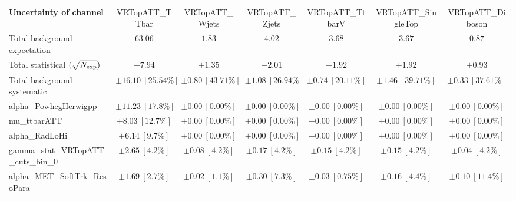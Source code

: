 
\begin{sidewaystable}
\begin{center}
\setlength{\tabcolsep}{0.0pc}
\begin{tabular*}{\textwidth}{@{\extracolsep{\fill}}lcccccc}
\noalign{\smallskip}\hline\noalign{\smallskip}
{\bf Uncertainty of channel}                                    & VRTopATT\_TTbar            & VRTopATT\_Wjets            & VRTopATT\_Zjets            & VRTopATT\_TtbarV            & VRTopATT\_SingleTop            & VRTopATT\_Diboson            \\
\noalign{\smallskip}\hline\noalign{\smallskip}
Total background expectation             &  $63.06$        &  $1.83$        &  $4.02$        &  $3.68$        &  $3.67$        &  $0.87$       \\
\noalign{\smallskip}\hline\noalign{\smallskip}
Total statistical $(\sqrt{N_{\rm exp}})$              & $\pm 7.94$        & $\pm 1.35$        & $\pm 2.01$        & $\pm 1.92$        & $\pm 1.92$        & $\pm 0.93$       \\
Total background systematic               & $\pm 16.10\ [25.54\%] $        & $\pm 0.80\ [43.71\%] $        & $\pm 1.08\ [26.94\%] $        & $\pm 0.74\ [20.11\%] $        & $\pm 1.46\ [39.71\%] $        & $\pm 0.33\ [37.61\%] $             \\
\noalign{\smallskip}\hline\noalign{\smallskip}
\noalign{\smallskip}\hline\noalign{\smallskip}
alpha\_PowhegHerwigpp         & $\pm 11.23\ [17.8\%] $          & $\pm 0.00\ [0.00\%] $          & $\pm 0.00\ [0.00\%] $          & $\pm 0.00\ [0.00\%] $          & $\pm 0.00\ [0.00\%] $          & $\pm 0.00\ [0.00\%] $       \\
mu\_ttbarATT         & $\pm 8.03\ [12.7\%] $          & $\pm 0.00\ [0.00\%] $          & $\pm 0.00\ [0.00\%] $          & $\pm 0.00\ [0.00\%] $          & $\pm 0.00\ [0.00\%] $          & $\pm 0.00\ [0.00\%] $       \\
alpha\_RadLoHi         & $\pm 6.14\ [9.7\%] $          & $\pm 0.00\ [0.00\%] $          & $\pm 0.00\ [0.00\%] $          & $\pm 0.00\ [0.00\%] $          & $\pm 0.00\ [0.00\%] $          & $\pm 0.00\ [0.00\%] $       \\
gamma\_stat\_VRTopATT\_cuts\_bin\_0         & $\pm 2.65\ [4.2\%] $          & $\pm 0.08\ [4.2\%] $          & $\pm 0.17\ [4.2\%] $          & $\pm 0.15\ [4.2\%] $          & $\pm 0.15\ [4.2\%] $          & $\pm 0.04\ [4.2\%] $       \\
alpha\_MET\_SoftTrk\_ResoPara         & $\pm 1.69\ [2.7\%] $          & $\pm 0.02\ [1.1\%] $          & $\pm 0.30\ [7.3\%] $          & $\pm 0.03\ [0.75\%] $          & $\pm 0.16\ [4.4\%] $          & $\pm 0.10\ [11.4\%] $       \\

\end{tabular*}
\end{center}
\end{sidewaystable}
